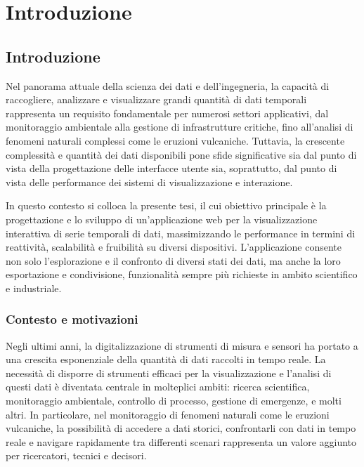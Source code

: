 \clearpage{\pagestyle{empty}\cleardoublepage}
\chapter{Introduzione}
\label{chap:introduzione}

\section{Introduzione}

Nel panorama attuale della scienza dei dati e dell’ingegneria, la capacità di raccogliere, analizzare e visualizzare grandi quantità di dati temporali rappresenta un requisito fondamentale per numerosi settori applicativi, dal monitoraggio ambientale alla gestione di infrastrutture critiche, fino all’analisi di fenomeni naturali complessi come le eruzioni vulcaniche. Tuttavia, la crescente complessità e quantità dei dati disponibili pone sfide significative sia dal punto di vista della progettazione delle interfacce utente sia, soprattutto, dal punto di vista delle performance dei sistemi di visualizzazione e interazione.

In questo contesto si colloca la presente tesi, il cui obiettivo principale è la progettazione e lo sviluppo di un’applicazione web per la visualizzazione interattiva di serie temporali di dati, massimizzando le performance in termini di reattività, scalabilità e fruibilità su diversi dispositivi. L’applicazione consente non solo l’esplorazione e il confronto di diversi stati dei dati, ma anche la loro esportazione e condivisione, funzionalità sempre più richieste in ambito scientifico e industriale.

\subsection{Contesto e motivazioni}

Negli ultimi anni, la digitalizzazione di strumenti di misura e sensori ha portato a una crescita esponenziale della quantità di dati raccolti in tempo reale. La necessità di disporre di strumenti efficaci per la visualizzazione e l’analisi di questi dati è diventata centrale in molteplici ambiti: ricerca scientifica, monitoraggio ambientale, controllo di processo, gestione di emergenze, e molti altri. In particolare, nel monitoraggio di fenomeni naturali come le eruzioni vulcaniche, la possibilità di accedere a dati storici, confrontarli con dati in tempo reale e navigare rapidamente tra differenti scenari rappresenta un valore aggiunto per ricercatori, tecnici e decisori.


